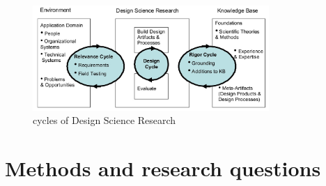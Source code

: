 \documentclass[a4paper,twoside,10pt]{report}
\begin{document}
\begin{figure}[H]
	\centering
	\includegraphics[width=0.8\textwidth]{Figure/DSR.jpg}
	\caption{cycles of Design Science Research}
	\label{fig:DSR_cycles}
\end{figure}

\section{Methods and research questions}\label{Methods}
\end{document}
